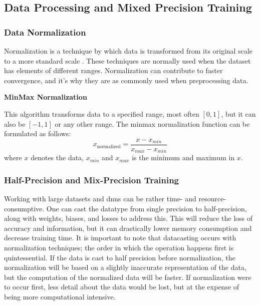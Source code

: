 \subsection{Data Processing and Mixed Precision Training}
\label{back:data}

\subsubsection{Data Normalization}

Normalization is a technique by which data is transformed from its original scale to a more standard scale \cite{ali2014data}. These techniques are normally used when the dataset has elements of different ranges. Normalization can contribute to faster convergence, and it's why they are as commonly used when preprocessing data. 

\textbf{MinMax Normalization} 

This algorithm transforms data to a specified range, most often $[0, 1]$, but it can also be $[-1, 1]$ or any other range.
The minmax normalization function can be formulated as follows:
\begin{equation}
   x_{\text{normalized}} = \dfrac{x - x_{min}}{x_{max}-x_{min}}
\end{equation}
\vspace{0.2cm}
where $x$ denotes the data, $x_{min}$ and $x_{max}$ is the minimum and maximum in $x$. \\
%
\subsubsection{Half-Precision and Mix-Precision Training}

Working with large datasets and \acrshort{dnn}s can be rather time- and resource-consumptive. One can cast the datatype from single precision to half-precision, along with weights, biases, and losses to address this. This will reduce the loss of accuracy and information, but it can drastically lower memory consumption and decrease training time. It is important to note that datacasting occurs with normalization techniques; the order in which the operation happens first is quintessential. If the data is cast to half precision before normalization, the normalization will be based on a slightly inaccurate representation of the data, but the computation of the normalized data will be faster. If normalization were to occur first, less detail about the data would be lost, but at the expense of being more computational intensive.\\

